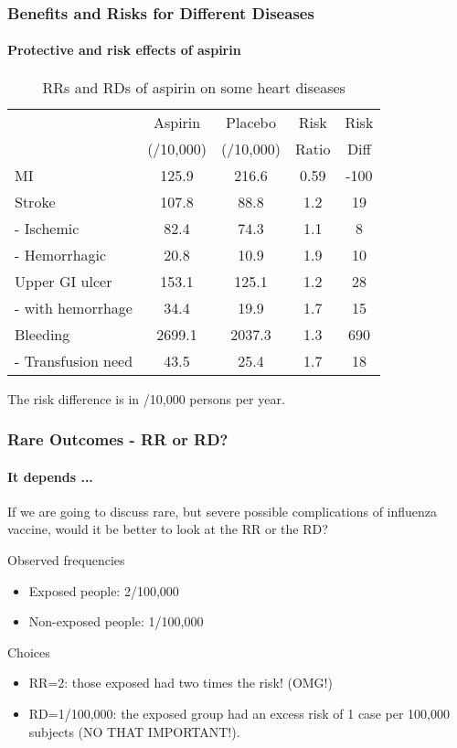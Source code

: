 \documentclass[table,10pt]{beamer}
\begin{document}
\begin{CJK*}{UTF8}{gbsn}
\begin{frame}[t]
\frametitle{Benefits and Risks for Different Diseases}
\framesubtitle{Protective and risk effects of aspirin}
\begin{table}
\renewcommand\arraystretch{1.2}
\caption{RRs and RDs of aspirin on some heart diseases}
\begin{tabular}{lcccc}
 & Aspirin & Placebo & Risk & Risk\\
 & (/10,000) & (/10,000) & Ratio & Diff\\
\hline
MI & 125.9 & 216.6 & 0.59 & -100\\
\hline
Stroke & 107.8 & 88.8 & 1.2 & 19\\
- Ischemic & 82.4 & 74.3 & 1.1 & 8\\
- Hemorrhagic & 20.8 & 10.9 & 1.9 & 10\\
\hline
Upper GI ulcer & 153.1 & 125.1 & 1.2 & 28\\
- with hemorrhage & 34.4 & 19.9 & 1.7 & 15\\
\hline
Bleeding & 2699.1 & 2037.3 & 1.3 & 690\\
- Transfusion need & 43.5 & 25.4 & 1.7 & 18\\
\hline
\end{tabular}
\end{table}
\center \alert{The risk difference is in /10,000 persons per year.}
\end{frame}

\begin{frame}[t]
\frametitle{Rare Outcomes - RR or RD?}
\framesubtitle{It depends ...}
If we are going to discuss rare, but severe possible complications of influenza vaccine, would 
it be better to look at the \alert{RR} or the \alert{RD}?
\begin{alertblock}{\center Observed frequencies}
\begin{itemize}
	\item Exposed people: 2/100,000
	\item Non-exposed people: 1/100,000
\end{itemize}
\end{alertblock}
\begin{alertblock}{\center Choices}
\begin{itemize}
	\item \alert{RR=2}: those exposed had two times the risk! (\alert{OMG!})
	\item \alert{RD=1/100,000}: the exposed group had an excess risk of 1 case 
		per 100,000 subjects (\alert{NO THAT IMPORTANT!}). 
\end{itemize}
\end{alertblock}
\end{frame}



\end{CJK*}
\end{document}
